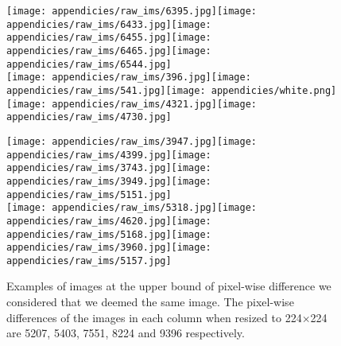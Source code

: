 \documentclass[letterpaper, 11pt]{IEEEtran}
\begin{document}
\begin{figure*}[!ht]   
    \centering
    \fontsize{9}{9}\selectfont
    \texttt{[image: appendicies/raw\_ims/6395.jpg]}\texttt{[image: appendicies/raw\_ims/6433.jpg]}\texttt{[image: appendicies/raw\_ims/6455.jpg]}\texttt{[image: appendicies/raw\_ims/6465.jpg]}\texttt{[image: appendicies/raw\_ims/6544.jpg]}\\
\vspace{-0.15em}
\texttt{[image: appendicies/raw\_ims/396.jpg]}\texttt{[image: appendicies/raw\_ims/541.jpg]}\texttt{[image: appendicies/white.png]}\texttt{[image: appendicies/raw\_ims/4321.jpg]}\texttt{[image: appendicies/raw\_ims/4730.jpg]}%
    \label{no_similar}
\end{figure*}
\begin{figure*}[!ht]
    \centering
    \fontsize{9}{9}\selectfont
    \texttt{[image: appendicies/raw\_ims/3947.jpg]}\texttt{[image: appendicies/raw\_ims/4399.jpg]}\texttt{[image: appendicies/raw\_ims/3743.jpg]}\texttt{[image: appendicies/raw\_ims/3949.jpg]}\texttt{[image: appendicies/raw\_ims/5151.jpg]}\\
\vspace{-0.0999em}
\texttt{[image: appendicies/raw\_ims/5318.jpg]}\texttt{[image: appendicies/raw\_ims/4620.jpg]}\texttt{[image: appendicies/raw\_ims/5168.jpg]}\texttt{[image: appendicies/raw\_ims/3960.jpg]}\texttt{[image: appendicies/raw\_ims/5157.jpg]}\\
     \caption{Examples of images at the upper bound of pixel-wise difference we considered that we deemed the same image. The pixel-wise differences of the images in each column when resized to 224$\times$224 are 5207, 5403, 7551, 8224 and 9396 respectively.}
    \label{similar}
\end{figure*}
\end{document}
